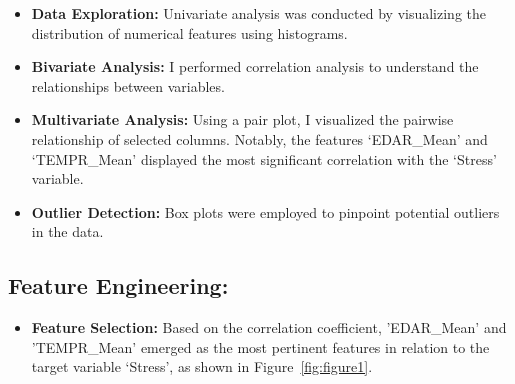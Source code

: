 \documentclass{article}
\begin{document}
\begin{itemize}
\item \textbf{Data Exploration:} Univariate analysis was conducted by visualizing the distribution of numerical features using histograms.

\item \textbf{Bivariate Analysis:} I performed correlation analysis to understand the relationships between variables.

\item \textbf{Multivariate Analysis:} Using a pair plot, I visualized the pairwise relationship of selected columns. Notably, the features `EDAR\_Mean' and `TEMPR\_Mean' displayed the most significant correlation with the `Stress' variable.

\item \textbf{Outlier Detection:} Box plots were employed to pinpoint potential outliers in the data.

\end{itemize}

\subsection{Feature Engineering:}

\begin{itemize}


\item \textbf{Feature Selection:} Based on the correlation coefficient, 'EDAR\_Mean' and 'TEMPR\_Mean' emerged as the most pertinent features in relation to the target variable ‘Stress’, as shown in Figure~\ref{fig:figure1}.

\end{itemize}
\end{document}
